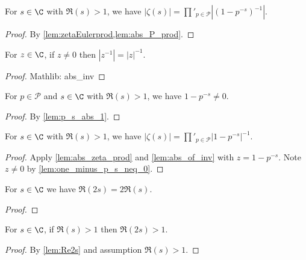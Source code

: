 \begin{lemma}\label{lem:abs_zeta_prod} 
\leanok
{}
For $s\in\C$ with $\Re(s)>1$, we have $|\zeta(s)| = \prod'_{p\in\mathcal{P}}|(1-p^{-s})^{-1}|$.
\end{lemma}
\begin{proof}
\leanok
{}
By \cref{lem:zetaEulerprod,lem:abs_P_prod}.
\end{proof}

\begin{lemma}\label{lem:abs_of_inv} 
\leanok
For $z\in\C$, if $z\neq0$ then $|z^{-1}| = |z|^{-1}$.
\end{lemma}
\begin{proof}
\leanok
Mathlib: abs\_inv
\end{proof}


\begin{lemma}\label{lem:one_minus_p_s_neq_0} 
\leanok
{}
For $p\in\mathcal{P}$ and $s\in\C$ with $\Re(s)>1$, we have $1-p^{-s}\neq0$.
\end{lemma}
\begin{proof}
\leanok
{}
By \cref{lem:p_s_abs_1}.
\end{proof}

\begin{lemma}\label{lem:abs_zeta_prod_prime} 
\leanok
{}
For $s\in\C$ with $\Re(s)>1$, we have $|\zeta(s)| = \prod'_{p\in\mathcal{P}}|1-p^{-s}|^{-1}$.
\end{lemma}
\begin{proof}
\leanok
Apply \cref{lem:abs_zeta_prod} and \cref{lem:abs_of_inv} with $z=1-p^{-s}$. Note $z\neq0$ by \cref{lem:one_minus_p_s_neq_0}.
\end{proof}

\begin{lemma}\label{lem:Re2s} 
\leanok
For $s\in\C$ we have $\Re(2s)=2\Re(s)$.
\end{lemma}
\begin{proof}
\leanok
\end{proof}

\begin{lemma}\label{lem:Re2sge1} 
\leanok
For $s\in\C$, if $\Re(s)>1$ then $\Re(2s)>1$.
\end{lemma}
\begin{proof}
\leanok
{}
By \cref{lem:Re2s} and assumption $\Re(s)>1$.
\end{proof}

